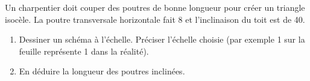
\begin{exercice}\label{exosmath-0824}

    Un charpentier doit couper des poutres de bonne longueur pour créer un triangle isocèle. La poutre transversale horizontale fait \unit{8}{\meter} et l'inclinaison du toit est de \unit{40}{\degree}. 
    \begin{enumerate}
        \item
            Dessiner un schéma à l'échelle. Préciser l'échelle choisie (par exemple \unit{1}{\centi\meter} sur la feuille représente \unit{1}{\meter} dans la réalité).
        \item
            En déduire la longueur des poutres inclinées.
    \end{enumerate}
    
\end{exercice}
